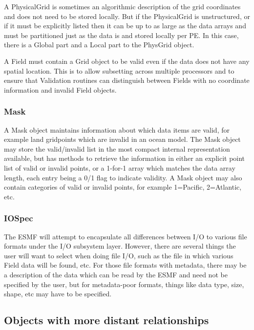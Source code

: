A PhysicalGrid is sometimes an algorithmic description of the
grid coordinates and does not need to be stored locally.  But if
the PhysicalGrid is unstructured, or if it must be explicitly
listed then it can be up to as large as the data arrays and
must be partitioned just as the data is and stored locally per PE.
In this case, there is a Global part and a Local part to the PhysGrid
object.

A Field must contain a Grid object to be valid even if the data does not
have any spatial location.  This is to allow subsetting across multiple
processors and to ensure that Validation routines can distinguish between
Fields with no coordinate information and invalid Field objects.

\subsubsection{Mask}

A Mask object maintains information about which data items are
valid, for example land gridpoints which are invalid in an ocean model.
The Mask object may store the valid/invalid list in the most 
compact internal representation available, but has methods to
retrieve the information in either an explicit point list of
valid or invalid points, or a 1-for-1 array which matches the
data array length, each entry being a 0/1 flag to indicate validity.
A Mask object may also contain categories of valid or invalid points, 
for example 1=Pacific, 2=Atlantic, etc.

\subsubsection{IOSpec}

The ESMF will attempt to encapsulate 
all differences between I/O to various file formats
under the I/O subsystem layer.  However, there are
several things the user will want to select when
doing file I/O, such as the file in which various
Field data will be found, etc.  For those file formats
with metadata, there may be a description of the data
which can be read by the ESMF and need not be
specified by the user, but for metadata-poor formats,
things like data type, size, shape, etc may have to
be specified.

\subsection{Objects with more distant relationships}

